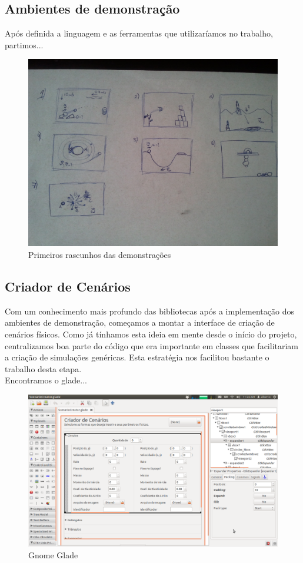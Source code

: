 \subsection{Ambientes de demonstração}
Após definida a linguagem e as ferramentas que utilizaríamos no trabalho, partimos...

\begin{figure}[H]
	\centering
	\includegraphics[scale=0.2]{images/tcc-demos.jpg}
	\caption{Primeiros rascunhos das demonstrações}
\end{figure}

\subsection{Criador de Cenários}
Com um conhecimento mais profundo das bibliotecas após a implementação dos ambientes de demonstração, começamos a montar a interface de criação de cenários físicos. Como já tínhamos esta ideia em mente desde o início do projeto, centralizamos boa parte do código que era importante em classes que facilitariam a criação de simulações genéricas. Esta estratégia nos facilitou bastante o trabalho desta etapa.\\

Encontramos o glade...

\begin{figure}[H]
	\centering
	\includegraphics[scale=0.3]{images/glade.png}
	\caption{Gnome Glade}
\end{figure}

